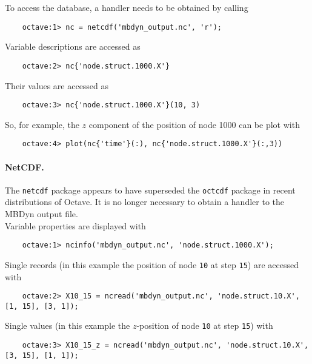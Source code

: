 To access the database, a handler needs to be obtained by calling
\begin{verbatim}
    octave:1> nc = netcdf('mbdyn_output.nc', 'r');
\end{verbatim}
Variable descriptions are accessed as
\begin{verbatim}
    octave:2> nc{'node.struct.1000.X'}
\end{verbatim}
Their values are accessed as
\begin{verbatim}
    octave:3> nc{'node.struct.1000.X'}(10, 3)
\end{verbatim}
So, for example, the $z$ component of the position of node 1000 can be plot with 
\begin{verbatim}
    octave:4> plot(nc{'time'}(:), nc{'node.struct.1000.X'}(:,3))
\end{verbatim}

\paragraph{NetCDF.}
The \texttt{netcdf} package appears to have superseded the \texttt{octcdf} package in recent
distributions of Octave. It is no longer necessary to obtain a handler to the MBDyn output file. \\

Variable properties are displayed with
\begin{verbatim}
    octave:1> ncinfo('mbdyn_output.nc', 'node.struct.1000.X');
\end{verbatim}
Single records (in this example the position of node \texttt{10} at step \texttt{15})
are accessed with
\begin{verbatim}
    octave:2> X10_15 = ncread('mbdyn_output.nc', 'node.struct.10.X', [1, 15], [3, 1]);
\end{verbatim}
Single values (in this example the $z$-position of node \texttt{10} at step \texttt{15}) 
with
\begin{verbatim}
    octave:3> X10_15_z = ncread('mbdyn_output.nc', 'node.struct.10.X', [3, 15], [1, 1]);
\end{verbatim}
